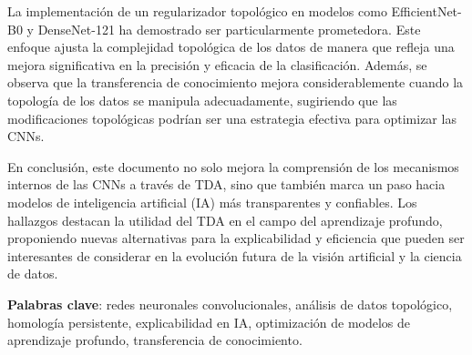 La implementación de un regularizador topológico en modelos como EfficientNet-B0
y DenseNet-121 ha demostrado ser particularmente prometedora. Este enfoque
ajusta la complejidad topológica de los datos de manera que refleja una mejora
significativa en la precisión y eficacia de la clasificación. Además, se observa
que la transferencia de conocimiento mejora considerablemente cuando la
topología de los datos se manipula adecuadamente, sugiriendo que las modificaciones
topológicas podrían ser una estrategia efectiva para optimizar las CNNs.

En conclusión, este documento no solo mejora la comprensión de los mecanismos
internos de las CNNs a través de TDA, sino que también marca un paso hacia modelos
de inteligencia artificial (IA) más transparentes y confiables. Los hallazgos
destacan la utilidad del TDA en el campo del aprendizaje profundo, proponiendo nuevas
alternativas para la explicabilidad y eficiencia que pueden ser interesantes de considerar
en la evolución futura de la visión artificial y la ciencia de datos.

\bigskip
\textbf{Palabras clave}: redes neuronales convolucionales, análisis de datos
topológico, homología persistente, explicabilidad en IA, optimización de modelos
de aprendizaje profundo, transferencia de conocimiento.

\endinput